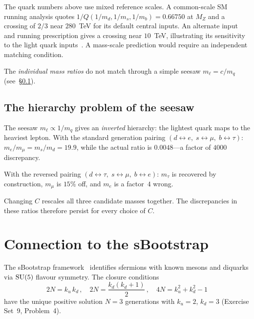 \documentclass[11pt,a4paper]{article}
\begin{document}
The quark numbers above use mixed reference scales.  A common-scale
SM running analysis quotes $1/Q(1/m_d,1/m_s,1/m_b)=0.66750$ at
$M_Z$ and a crossing of $2/3$ near $280$~TeV for its default
central inputs.  An alternate input and running prescription gives
a crossing near $10$~TeV, illustrating its sensitivity to the light
quark inputs~\cite{Rivero2026Inverse}.  A mass-scale prediction would
require an independent matching condition.

The \emph{individual mass ratios} do not match through a simple
seesaw $m_\ell = c/m_q$ (see~\S\ref{sec:caveats}).

\subsection{The hierarchy problem of the seesaw}
\label{sec:caveats}

The seesaw $m_\ell \propto 1/m_q$ gives an \emph{inverted}
hierarchy: the lightest quark maps to the heaviest lepton.
With the standard generation pairing $(d \leftrightarrow e,\;
s \leftrightarrow \mu,\; b \leftrightarrow \tau)$:
$m_e/m_\mu = m_s/m_d = 19.9$, while the actual ratio is
$0.0048$---a factor of $4000$ discrepancy.

With the reversed pairing $(d \leftrightarrow \tau,\;
s \leftrightarrow \mu,\; b \leftrightarrow e)$: $m_\tau$
is recovered by construction, $m_\mu$ is $15\%$ off, and
$m_e$ is a factor~$4$ wrong.

Changing $C$ rescales all three candidate masses together.  The
discrepancies in these ratios therefore persist for every choice of $C$.

\section{Connection to the sBootstrap}
\label{sec:sbootstrap}

The sBootstrap framework~\cite{Rivero2009,Rivero2024} identifies
sfermions with known mesons and diquarks via $\mathrm{SU}(5)$ flavour
symmetry.  The closure conditions~\cite{Rivero2024}
\begin{equation}
  2N = k_u\,k_d\,,\quad
  2N = \frac{k_d(k_d+1)}{2}\,,\quad
  4N = k_u^2+k_d^2-1
\end{equation}
have the unique positive solution $N = 3$ generations with
$k_u = 2$, $k_d = 3$ (Exercise Set~9, Problem~4).
\end{document}
